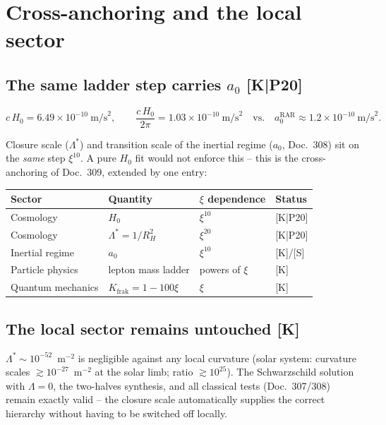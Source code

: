 \documentclass[11pt]{report}
\begin{document}
\chapter{Cross-anchoring and the local sector}

\section{The same ladder step carries $a_0$ [K|P20]}

\[
  c\,H_0 = 6.49\times10^{-10}~\text{m/s}^2,
  \qquad
  \frac{c\,H_0}{2\pi} = 1.03\times10^{-10}~\text{m/s}^2
  \quad\text{vs.}\quad
  a_0^\text{RAR} \approx 1.2\times10^{-10}~\text{m/s}^2.
\]

Closure scale ($\Lambda^{*}$) and transition scale of the inertial
regime ($a_0$, Doc.~308) sit on the \emph{same} step $\xi^{10}$. A
pure $H_0$ fit would not enforce this -- this is the cross-anchoring
of Doc.~309, extended by one entry:

\begin{center}
\begin{tabular}{llll}
\toprule
Sector & Quantity & $\xi$ dependence & Status \\
\midrule
Cosmology & $H_0$ & $\xi^{10}$ & [K|P20] \\
Cosmology & $\Lambda^{*} = 1/R_H^2$ & $\xi^{20}$ & [K|P20] \\
Inertial regime & $a_0$ & $\xi^{10}$ & [K]/[S] \\
Particle physics & lepton mass ladder & powers of $\xi$ & [K] \\
Quantum mechanics & $K_\text{frak} = 1-100\xi$ & $\xi$ & [K] \\
\bottomrule
\end{tabular}
\end{center}

\section{The local sector remains untouched [K]}

$\Lambda^{*} \sim 10^{-52}$~m$^{-2}$ is negligible against any local
curvature (solar system: curvature scales
$\gtrsim 10^{-27}$~m$^{-2}$ at the solar limb; ratio
$\gtrsim 10^{25}$). The Schwarzschild solution with $\Lambda = 0$,
the two-halves synthesis, and all classical tests (Doc.~307/308)
remain exactly valid -- the closure scale automatically supplies the
correct hierarchy without having to be switched off locally.
\end{document}
